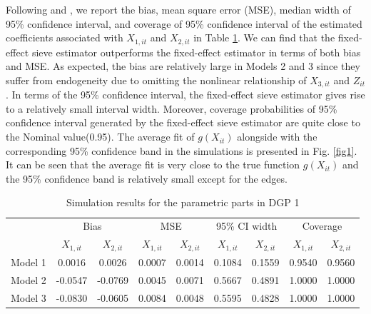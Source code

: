 Following \citet{sim2006} and \citet{white2010simsum}, we report the bias, mean square error (MSE), median width of 95\% confidence interval, and coverage of 95\% confidence interval of the estimated coefficients associated with $X_{1,it}$ and $X_{2,it}$ in Table \ref{tab1}. We can find that the fixed-effect sieve estimator outperforms the fixed-effect estimator in terms of both bias and MSE. As expected, the bias are relatively large in Models 2 and 3 since they suffer from endogeneity due to omitting the nonlinear relationship of $X_{3,it}$ and $Z_{it}$. In terms of the 95\% confidence interval, the fixed-effect sieve estimator gives rise to a relatively small interval width. Moreover, coverage probabilities of 95\% confidence interval generated by the fixed-effect sieve estimator are quite close to the Nominal value(0.95). The average fit of $g(X_{it})$ alongside with the corresponding 95\% confidence band in the simulations is presented in Fig. \ref{fig1}. It can be seen that the average fit is very close to the true function $g(X_{it})$ and the 95\% confidence band is relatively small except for the edges.


\begin{table}[htbp]
	
	\scriptsize
	
	\centering
	
	\caption{Simulation results for the parametric parts in DGP 1}
	
	\label{Tab03}
	
	\begin{tabular}{ccccccccc}
		
		\toprule
		
		\multirow{1}{*}{} & \multicolumn{2}{c}{Bias} & \multicolumn{2}{c}{MSE} & \multicolumn{2}{c}{95\% CI width}& \multicolumn{2}{c}{Coverage} \\
		
		\cmidrule(r){2-3} \cmidrule(r){4-5} \cmidrule(r){6-7} \cmidrule(r){8-9}
		
		&  $X_{1,it}$      &  $X_{2,it}$   &  $X_{1,it}$      &  $X_{2,it}$  & $X_{1,it}$      &  $X_{2,it}$ & $X_{1,it}$      &  $X_{2,it}$  \\
		
		\midrule
		
		Model 1 &    0.0016 &    0.0026 &    0.0007 &    0.0014 &    0.1084 &    0.1559 &    0.9540 &    0.9560 \\ 
		Model 2 &   -0.0547 &   -0.0769 &    0.0045 &    0.0071 &    0.5667 &    0.4891 &    1.0000 &    1.0000 \\ 
		Model 3 &   -0.0830 &   -0.0605 &    0.0084 &    0.0048 &    0.5595 &    0.4828 &    1.0000 &    1.0000 \\ 
		
		\bottomrule
		
	\end{tabular}
	\label{tab1}	
\end{table}



